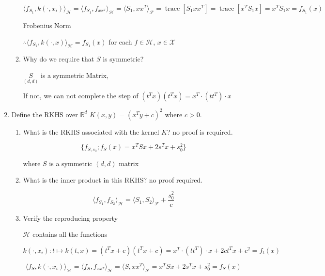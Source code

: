 \documentclass[11pt]{article}
\DeclareMathOperator{\trace}{trace}
\begin{document}
\begin{enumerate}
\begin{enumerate}
$$ \langle f_{S_1},k(\cdot,x_i)\rangle_{\mathcal{H}}=\langle f_{S_1},f_{xx^T}\rangle_{\mathcal{H}}=\langle S_1,xx^T\rangle_{\mathcal{F}}=\trace[S_1xx^T]=\trace[x^TS_1x]=x^TS_1 x= f_{S_1}(x)$$

Frobenius Norm

$\therefore\langle f_{S_1},k(\cdot,x)\rangle_{\mathcal{H}}=f_{S_1}(x)$ for each $f\in\mathcal{H}$, $x\in\mathcal{X}$


\item Why do we require that $S$ is symmetric?

$\underset{(d,d)}{S}$ is a symmetric Matrix,


If not, we can not complete the step of $(t^Tx)(t^Tx)=x^T\cdot (tt^T)\cdot x$


\end{enumerate}

\item Define the RKHS  over $\mathbb{R}^d$ $K(x,y)=(x^Ty+c)^2$ where $c>0$. 

\begin{enumerate}
\item What is the RKHS associated with the kernel $K$? no proof is required. 

$$\{f_{S,s_0}; f_S(x)=x^T S x+2s^Tx+s_0^2\}$$

where $S$ is a symmetric $(d,d)$ matrix

\item What is the inner product in this RKHS? no proof required.  


$$\langle f_{S_1},f_{S_2}\rangle_{\mathcal{H}}=\langle S_1,S_2\rangle_{\mathcal{F}}+\frac{s_0^2}c$$

\item Verify the reproducing property

$\mathcal{H}$ contains all the functions 

$k(\cdot,x_i): t\mapsto k(t,x)=(t^Tx+c)(t^Tx+c)=x^T\cdot (tt^T)\cdot x+2ct^Tx+c^2=f_t(x)$


$$ \langle f_{S},k(\cdot,x_i)\rangle_{\mathcal{H}}=\langle f_{S},f_{xx^T}\rangle_{\mathcal{H}}=\langle S,xx^T\rangle_{\mathcal{F}}=x^T Sx+2s^Tx+s_0^2= f_{S}(x)$$

\end{enumerate}

\end{enumerate}
\end{document}
